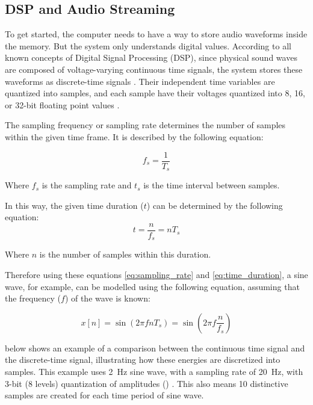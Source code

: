 \subsection{DSP and Audio Streaming}

To get started, the computer needs to have a way to store audio waveforms inside the memory. But the system only understands digital values.
According to all known concepts of Digital Signal Processing (DSP), since physical sound waves are composed of voltage-varying continuous 
time signals, the system stores these waveforms as discrete-time signals \cite{lyons2004dsp}. Their independent time variables are quantized 
into samples, and each sample have their voltages quantized into 8, 16, or 32-bit floating point values \cite{lisacademy2026digitalaudio}.

The sampling frequency or sampling rate determines the number of samples within the given time frame. It is described by the following
equation:

\begin{equation}\label{eq:sampling_rate}
    f_s = \frac{1}{T_s}
\end{equation}

Where $f_s$ is the sampling rate and $t_s$ is the time interval between samples.

In this way, the given time duration ($t$) can be determined by the following equation:
\begin{equation}\label{eq:time_duration}
    t = \frac{n}{f_s} = n T_s
\end{equation}

Where $n$ is the number of samples within this duration.

Therefore using these equations \eqref{eq:sampling_rate} and \eqref{eq:time_duration}, a sine wave, for example, can be modelled
using the following equation, assuming that the frequency ($f$) of the wave is known:

\begin{equation}
    x[n] = \sin{(2 \pi f n T_s)} = \sin{ \left(2 \pi f \frac{n}{f_s}\right) }
\end{equation}

 below shows an example of a comparison between the continuous time signal and the discrete-time signal, 
illustrating how these energies are discretized into samples. This example uses \SI{2}{\hertz} sine wave, with a sampling rate
of \SI{20}{\hertz}, with 3-bit (8 levels) quantization of amplitudes () \cite{anthropicclaude}. 
This also means 10 distinctive samples 
are created for each time period of sine wave.

